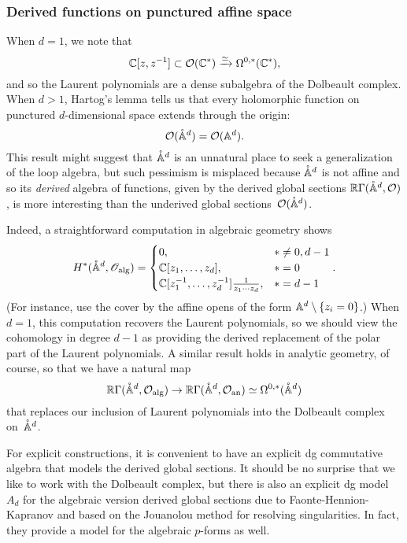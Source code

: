 \subsubsection{Derived functions on punctured affine space}

When $d=1$, we note that
\[
\CC[z,z^{-1}] \subset \cO(\CC^*) \xto{\simeq} \Omega^{0,*}(\CC^*),
\]
and so the Laurent polynomials are a dense subalgebra of the Dolbeault complex.
When $d >1$, Hartog's lemma tells us that every holomorphic function on punctured $d$-dimensional space extends through the origin:
\[
\cO(\pAA^d) = \cO(\AA^d).
\]
This result might suggest that $\pAA^d$ is an unnatural place to seek a generalization of the loop algebra,
but such pessimism is misplaced because $\pAA^d$ is not affine 
and so its {\em derived} algebra of functions, 
given by the derived global sections $\RR \Gamma(\pAA^d, \cO)$, 
is more interesting than the underived global sections~$\cO(\pAA^d)$.

Indeed, a straightforward computation in algebraic geometry shows
\[
H^*(\pAA^{d}, \sO_{\rm alg}) = 
\begin{cases} 
0, & * \neq 0, d-1 \\ 
\CC[z_1,\ldots,z_d], & * = 0 \\ \CC[z_1^{-1},\ldots,z_d^{-1}] \frac{1}{z_1 \cdots z_d}, & * = d-1 
\end{cases}.
\]
(For instance, use the cover by the affine opens of the form $\AA^d \setminus \{z_i =0\}$.)
When $d=1$, this computation recovers the Laurent polynomials,
so we should view the cohomology in degree $d-1$ as providing the derived replacement of the polar part of the Laurent polynomials.
A similar result holds in analytic geometry, of course,
so that we have a natural map
\[
\RR \Gamma(\pAA^d, \cO_{\rm alg}) \to \RR \Gamma(\pAA^d, \cO_{\rm an}) \simeq \Omega^{0,*}(\pAA^d)
\]
that replaces our inclusion of Laurent polynomials into the Dolbeault complex on~$\pAA^d$.

For explicit constructions, it is convenient to have an explicit dg commutative algebra that models the derived global sections.
It should be no surprise that we like to work with the Dolbeault complex,
but there is also an explicit dg model $A_d$ for the algebraic version derived global sections due to Faonte-Hennion-Kapranov \cite{FHK} and based on the Jouanolou method for resolving singularities. 
In fact, they provide a model for the algebraic $p$-forms as well.

